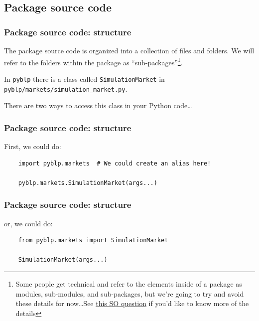 \documentclass[10pt]{beamer}
\begin{document}
  \subsection{Package source code}

  \begin{frame} \frametitle{Package source code: structure}

    The package source code is organized into a collection of files and folders. We will
    refer to the folders within the package as ``sub-packages''\footnote{
    Some people get technical and refer to the elements inside of a package as modules,
    sub-modules, and sub-packages, but we're going to try and avoid these details for
    now\dots See
    \href{
    https://stackoverflow.com/questions/7948494/whats-the-difference-between-a-python-module-and-a-python-package
    }{this SO question} if you'd like to know more of the details}.

    \vspace{0.25cm}

    In \texttt{pyblp} there is a class called \texttt{SimulationMarket} in
    \texttt{pyblp/markets/simulation\_market.py}.

    \vspace{0.25cm}

    There are two ways to access this class in your Python code\dots

  \end{frame}

  \begin{frame}[fragile] \frametitle{Package source code: structure}

    First, we could do:

    \vspace{0.5cm}

    \begin{lstlisting}
    import pyblp.markets  # We could create an alias here!

    pyblp.markets.SimulationMarket(args...)
    \end{lstlisting}

  \end{frame}

  \begin{frame}[fragile] \frametitle{Package source code: structure}

    or, we could do:

    \vspace{0.5cm}

    \begin{lstlisting}
    from pyblp.markets import SimulationMarket

    SimulationMarket(args...)
    \end{lstlisting}

  \end{frame}
\end{document}
